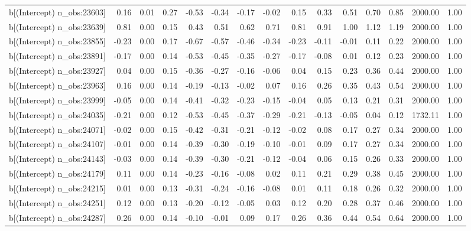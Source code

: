 \begin{table}[ht]
\begin{tabular}{rrrrrrrrrrrrrrr}
  b[(Intercept) n\_obs:23603] & 0.16 & 0.01 & 0.27 & -0.53 & -0.34 & -0.17 & -0.02 & 0.15 & 0.33 & 0.51 & 0.70 & 0.85 & 2000.00 & 1.00 \\ 
  b[(Intercept) n\_obs:23639] & 0.81 & 0.00 & 0.15 & 0.43 & 0.51 & 0.62 & 0.71 & 0.81 & 0.91 & 1.00 & 1.12 & 1.19 & 2000.00 & 1.00 \\ 
  b[(Intercept) n\_obs:23855] & -0.23 & 0.00 & 0.17 & -0.67 & -0.57 & -0.46 & -0.34 & -0.23 & -0.11 & -0.01 & 0.11 & 0.22 & 2000.00 & 1.00 \\ 
  b[(Intercept) n\_obs:23891] & -0.17 & 0.00 & 0.14 & -0.53 & -0.45 & -0.35 & -0.27 & -0.17 & -0.08 & 0.01 & 0.12 & 0.23 & 2000.00 & 1.00 \\ 
  b[(Intercept) n\_obs:23927] & 0.04 & 0.00 & 0.15 & -0.36 & -0.27 & -0.16 & -0.06 & 0.04 & 0.15 & 0.23 & 0.36 & 0.44 & 2000.00 & 1.00 \\ 
  b[(Intercept) n\_obs:23963] & 0.16 & 0.00 & 0.14 & -0.19 & -0.13 & -0.02 & 0.07 & 0.16 & 0.26 & 0.35 & 0.43 & 0.54 & 2000.00 & 1.00 \\ 
  b[(Intercept) n\_obs:23999] & -0.05 & 0.00 & 0.14 & -0.41 & -0.32 & -0.23 & -0.15 & -0.04 & 0.05 & 0.13 & 0.21 & 0.31 & 2000.00 & 1.00 \\ 
  b[(Intercept) n\_obs:24035] & -0.21 & 0.00 & 0.12 & -0.53 & -0.45 & -0.37 & -0.29 & -0.21 & -0.13 & -0.05 & 0.04 & 0.12 & 1732.11 & 1.00 \\ 
  b[(Intercept) n\_obs:24071] & -0.02 & 0.00 & 0.15 & -0.42 & -0.31 & -0.21 & -0.12 & -0.02 & 0.08 & 0.17 & 0.27 & 0.34 & 2000.00 & 1.00 \\ 
  b[(Intercept) n\_obs:24107] & -0.01 & 0.00 & 0.14 & -0.39 & -0.30 & -0.19 & -0.10 & -0.01 & 0.09 & 0.17 & 0.27 & 0.34 & 2000.00 & 1.00 \\ 
  b[(Intercept) n\_obs:24143] & -0.03 & 0.00 & 0.14 & -0.39 & -0.30 & -0.21 & -0.12 & -0.04 & 0.06 & 0.15 & 0.26 & 0.33 & 2000.00 & 1.00 \\ 
  b[(Intercept) n\_obs:24179] & 0.11 & 0.00 & 0.14 & -0.23 & -0.16 & -0.08 & 0.02 & 0.11 & 0.21 & 0.29 & 0.38 & 0.45 & 2000.00 & 1.00 \\ 
  b[(Intercept) n\_obs:24215] & 0.01 & 0.00 & 0.13 & -0.31 & -0.24 & -0.16 & -0.08 & 0.01 & 0.11 & 0.18 & 0.26 & 0.32 & 2000.00 & 1.00 \\ 
  b[(Intercept) n\_obs:24251] & 0.12 & 0.00 & 0.13 & -0.20 & -0.12 & -0.05 & 0.03 & 0.12 & 0.20 & 0.28 & 0.37 & 0.46 & 2000.00 & 1.00 \\ 
  b[(Intercept) n\_obs:24287] & 0.26 & 0.00 & 0.14 & -0.10 & -0.01 & 0.09 & 0.17 & 0.26 & 0.36 & 0.44 & 0.54 & 0.64 & 2000.00 & 1.00 \\ 

\end{tabular}
\end{table}
